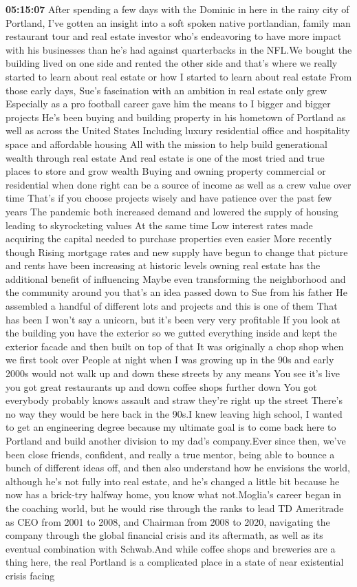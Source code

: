 \documentclass{article}%
\begin{document}
\textbf{05:15:07}%
After spending a few days with the Dominic in here in the rainy city of Portland, I've gotten an insight into a soft spoken native portlandian, family man restaurant tour and real estate investor who's endeavoring to have more impact with his businesses than he's had against quarterbacks in the NFL.We bought the building lived on one side and rented the other side and that's where we really started to learn about real estate or how I started to learn about real estate From those early days, Sue's fascination with an ambition in real estate only grew Especially as a pro football career gave him the means to I bigger and bigger projects He's been buying and building property in his hometown of Portland as well as across the United States Including luxury residential office and hospitality space and affordable housing All with the mission to help build generational wealth through real estate And real estate is one of the most tried and true places to store and grow wealth Buying and owning property commercial or residential when done right can be a source of income as well as a crew value over time That's if you choose projects wisely and have patience over the past few years The pandemic both increased demand and lowered the supply of housing leading to skyrocketing values At the same time Low interest rates made acquiring the capital needed to purchase properties even easier More recently though Rising mortgage rates and new supply have begun to change that picture and rents have been increasing at historic levels owning real estate has the additional benefit of influencing Maybe even transforming the neighborhood and the community around you that's an idea passed down to Sue from his father He assembled a handful of different lots and projects and this is one of them That has been I won't say a unicorn, but it's been very very profitable If you look at the building you have the exterior so we gutted everything inside and kept the exterior facade and then built on top of that It was originally a chop shop when we first took over People at night when I was growing up in the 90s and early 2000s would not walk up and down these streets by any means You see it's live you got great restaurants up and down coffee shops further down You got everybody probably knows assault and straw they're right up the street There's no way they would be here back in the 90s.I knew leaving high school, I wanted to get an engineering degree because my ultimate goal is to come back here to Portland and build another division to my dad's company.Ever since then, we've been close friends, confident, and really a true mentor, being able to bounce a bunch of different ideas off, and then also understand how he envisions the world, although he's not fully into real estate, and he's changed a little bit because he now has a brick{-}try halfway home, you know what not.Moglia's career began in the coaching world, but he would rise through the ranks to lead TD Ameritrade as CEO from 2001 to 2008, and Chairman from 2008 to 2020, navigating the company through the global financial crisis and its aftermath, as well as its eventual combination with Schwab.And while coffee shops and breweries are a thing here, the real Portland is a complicated place in a state of near existential crisis facing 
\end{document}
